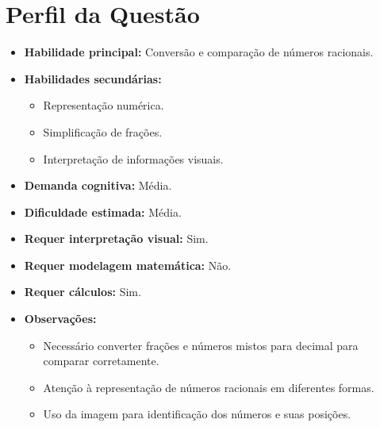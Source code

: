 \documentclass{article}
\begin{document}
\section{Perfil da Questão}
\begin{itemize}
  \item \textbf{Habilidade principal:} Conversão e comparação de números racionais.
  \item \textbf{Habilidades secundárias:}
  \begin{itemize}
    \item Representação numérica.
    \item Simplificação de frações.
    \item Interpretação de informações visuais.
  \end{itemize}
  \item \textbf{Demanda cognitiva:} Média.
  \item \textbf{Dificuldade estimada:} Média.
  \item \textbf{Requer interpretação visual:} Sim.
  \item \textbf{Requer modelagem matemática:} Não.
  \item \textbf{Requer cálculos:} Sim.
  \item \textbf{Observações:}
  \begin{itemize}
    \item Necessário converter frações e números mistos para decimal para comparar corretamente.
    \item Atenção à representação de números racionais em diferentes formas.
    \item Uso da imagem para identificação dos números e suas posições.
  \end{itemize}
\end{itemize}
\end{document}
